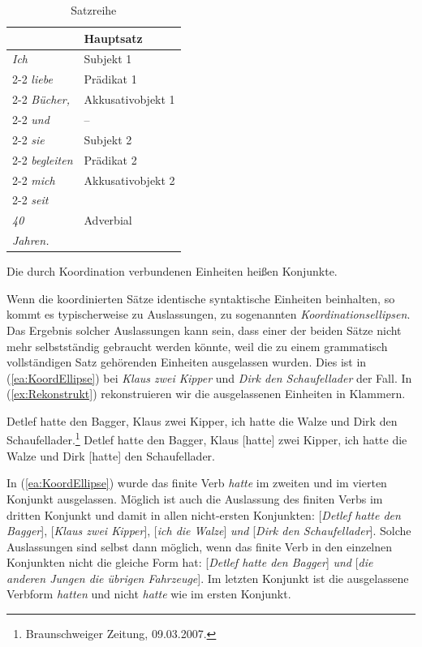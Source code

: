 \begin{table}
  \centering
  \begin{tabular}{l|l}
      & Hauptsatz \\
    \hline
    \textit{Ich} & Subjekt 1 \\ \cline{2-2} 
    \textit{liebe} & Prädikat 1 \\ \cline{2-2}
    \textit{Bücher,} & Akkusativobjekt 1 \\ \cline{2-2}
    \textit{und} & -- \\ \cline{2-2}
    \textit{sie} & Subjekt 2 \\ \cline{2-2}
    \textit{begleiten} & Prädikat 2 \\ \cline{2-2}
    \textit{mich} & Akkusativobjekt 2 \\ \cline{2-2}
    \textit{seit} & \multirow{3}{*}{Adverbial} \\ 
    \textit{40} &  \\
    \textit{Jahren.} & \\  
    \hline 
  \end{tabular}
  \caption{Satzreihe}
  \label{tab:Satzreihe}
\end{table}

Die durch Koordination verbundenen Einheiten heißen Konjunkte. 

Wenn die koordinierten Sätze identische syntaktische Einheiten beinhalten, so kommt es typischerweise zu Auslassungen, zu sogenannten \textit{Koordinationsellipsen}. Das Ergebnis solcher Auslassungen kann sein, dass einer der beiden Sätze nicht mehr selbstständig gebraucht werden könnte, weil die zu einem grammatisch vollständigen Satz gehörenden Einheiten ausgelassen wurden. Dies ist in (\ref{ea:KoordEllipse}) bei \textit{Klaus zwei Kipper} und \textit{Dirk den Schaufellader} der Fall. In (\ref{ex:Rekonstrukt}) rekonstruieren wir die ausgelassenen Einheiten in Klammern.


\ea 
\ea \label{ea:KoordEllipse} Detlef hatte den Bagger, Klaus zwei Kipper, ich hatte die Walze und Dirk den Schaufellader.\footnote{Braunschweiger Zeitung, 09.03.2007.}
\ex \label{ex:Rekonstrukt} Detlef hatte den Bagger, Klaus [hatte] zwei Kipper, ich hatte die Walze und Dirk [hatte] den Schaufellader.
\z  
\z 

In (\ref{ea:KoordEllipse}) wurde das finite Verb \textit{hatte} im zweiten und im vierten Konjunkt ausgelassen. Möglich ist auch die Auslassung des finiten Verbs im dritten Konjunkt und damit in allen nicht-ersten Konjunkten: [\textit{Detlef hatte den Bagger}], [\textit{Klaus zwei Kipper}], [\textit{ich die Walze}] \textit{und} [\textit{Dirk den Schaufellader}]. Solche Auslassungen sind selbst dann möglich, wenn das finite Verb in den einzelnen Konjunkten nicht die gleiche Form hat: [\textit{Detlef hatte den Bagger}] \textit{und} [\textit{die anderen Jungen die übrigen Fahrzeuge}]. Im letzten Konjunkt ist die ausgelassene Verbform \textit{hatten} und nicht \textit{hatte} wie im ersten Konjunkt. 

